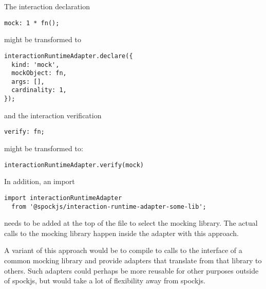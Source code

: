 The interaction declaration
\begin{verbatim}
mock: 1 * fn();
\end{verbatim}
might be transformed to
\begin{verbatim}
interactionRuntimeAdapter.declare({
  kind: 'mock',
  mockObject: fn,
  args: [],
  cardinality: 1,
});
\end{verbatim}
and the interaction verification
\begin{verbatim}
verify: fn;
\end{verbatim}
might be transformed to:
\begin{verbatim}
interactionRuntimeAdapter.verify(mock)
\end{verbatim}
In addition, an import
\begin{verbatim}
import interactionRuntimeAdapter
  from '@spockjs/interaction-runtime-adapter-some-lib';
\end{verbatim}
needs to be added at the top of the file
to select the mocking library.
The actual calls to the mocking library
happen inside the adapter with this approach.

A variant of this approach would be to compile to calls
to the interface of a common mocking library
and provide adapters that translate from that library to others.
Such adapters could perhaps be more reusable
for other purposes outside of spockjs,
but would take a lot of flexibility away from spockjs.
